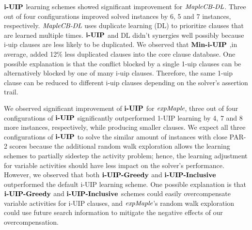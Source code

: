 $\textbf{i-UIP}$ learning schemes showed significant improvement for $\textit{MapleCB-DL}$. Three out of four configurations improved solved instances by 6, 5 and 7 instances, respectively. $\textit{MapleCB-DL}$ uses duplicate learning (DL) to prioritize clauses that are learned multiple times. $\textbf{i-UIP}$ and DL didn't synergies well possibly because i-uip clauses are less likely to be duplicated. We observed that $\textbf{Min-i-UIP}$ ,in average, added 12\% less duplicated clauses into the core clause database. One possible explanation is that the conflict blocked by a single 1-uip clauses can be alternatively blocked by one of many i-uip clauses. Therefore, the same 1-uip clause can be reduced to different i-uip clauses depending on the solver's assertion trail.

We observed significant improvement of $\textbf{i-UIP}$ for $\textit{expMaple}$, three out of four configurations of $\textbf{i-UIP}$ significantly outperformed 1-UIP learning by 4, 7 and 8 more instances, respectively, while producing smaller clauses. We expect all three configurations of $\textbf{i-UIP}$ to solve the similar amount of instances with close PAR-2 scores because the additional random walk exploration allows the learning schemes to partially sidestep the activity problem; hence, the learning adjustment for variable activities should have less impact on the solver's performance. However, we observed that both $\textbf{i-UIP-Greedy}$ and $\textbf{i-UIP-Inclusive}$ outperformed the default i-UIP learning scheme. One possible explanation is that $\textbf{i-UIP-Greedy}$ and $\textbf{i-UIP-Inclusive}$ schemes could easily overcompensate variable activities for i-UIP clauses, and $\textit{expMaple}$'s random walk exploration could use future search information to mitigate the negative effects of our overcompensation. 


